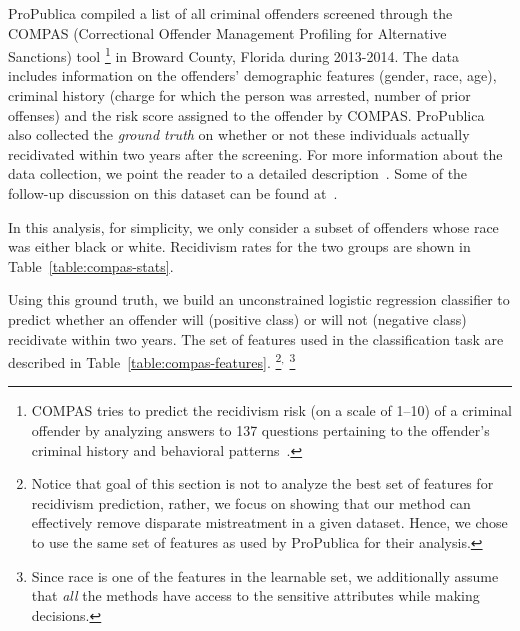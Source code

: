 \documentclass[letterpaper]{sig-alternate-2013}
\newcommand{\xhdr}[1]{\vspace{0.5mm}\noindent{{\bf #1.}}}
\newcommand{\disc}{disparate mistreatment}
\begin{document}
\vspace{1.5mm}
\xhdr{Dataset and experimental setup}
ProPublica compiled a list of all criminal offenders screened through the COMPAS (Correctional Offender Management Profiling for Alternative Sanctions) tool
\footnote{
\scriptsize{COMPAS tries to predict the recidivism risk (on a scale of 1--10) of a criminal offender by analyzing answers to 137 questions pertaining to the offender's criminal history and behavioral patterns~\cite{compas_questions}.}
}
in Broward County, Florida during 2013-2014. The data includes information on the offenders' demographic features (gender, race,
age), criminal history (charge for which the person was arrested, number of prior offenses) and the risk score assigned to the offender
by COMPAS. ProPublica also collected the \emph{ground truth} on whether or not these individuals actually recidivated within two
years after the screening.
For more information about the data collection, we point the reader to a detailed description~\cite{propublica_methodology}.
Some of the follow-up discussion on this dataset can be found at~\cite{propublica_response,flores_rejoinder}.

In this analysis, for simplicity, we only consider a subset of offenders whose race was either black or white. Recidivism rates for the two groups are shown in Table~\ref{table:compas-stats}.

Using this ground truth, we build an unconstrained logistic regression classifier to predict whether an offender will (positive class) or
will not (negative class) recidivate within two years. The set of features used in the classification task are described
in Table~\ref{table:compas-features}.
\footnote{
\scriptsize{Notice that goal of this section is not to analyze the best set of features for recidivism prediction, rather, we
focus on showing that our method can effectively remove \disc{} in a given dataset. Hence, we chose to use the same
set of features as used by ProPublica for their analysis.}
}${}^{,}$
\footnote{
\scriptsize{Since race is one of the features in the learnable set, we additionally assume that \textit{all} the methods have
access to the sensitive attributes while making decisions.}
}
\end{document}
